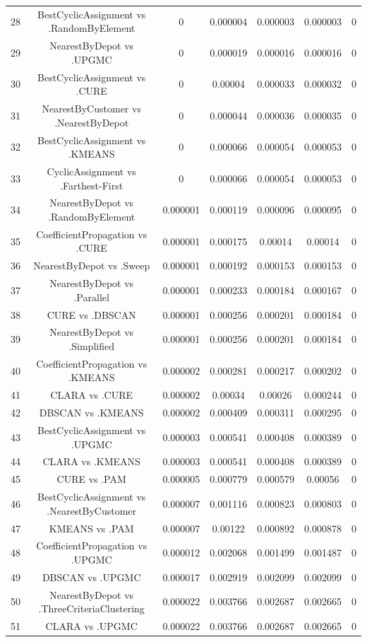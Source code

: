 \documentclass[a4paper,10pt]{article}
\begin{document}
\begin{landscape}
\begin{table}[!htp]
\begin{tabular}{ccccccc}
28&BestCyclicAssignment vs .RandomByElement&0&0.000004&0.000003&0.000003&0\\
29&NearestByDepot vs .UPGMC&0&0.000019&0.000016&0.000016&0\\
30&BestCyclicAssignment vs .CURE&0&0.00004&0.000033&0.000032&0\\
31&NearestByCustomer vs .NearestByDepot&0&0.000044&0.000036&0.000035&0\\
32&BestCyclicAssignment vs .KMEANS&0&0.000066&0.000054&0.000053&0\\
33&CyclicAssignment vs .Farthest-First&0&0.000066&0.000054&0.000053&0\\
34&NearestByDepot vs .RandomByElement&0.000001&0.000119&0.000096&0.000095&0\\
35&CoefficientPropagation vs .CURE&0.000001&0.000175&0.00014&0.00014&0\\
36&NearestByDepot vs .Sweep&0.000001&0.000192&0.000153&0.000153&0\\
37&NearestByDepot vs .Parallel&0.000001&0.000233&0.000184&0.000167&0\\
38&CURE vs .DBSCAN&0.000001&0.000256&0.000201&0.000184&0\\
39&NearestByDepot vs .Simplified&0.000001&0.000256&0.000201&0.000184&0\\
40&CoefficientPropagation vs .KMEANS&0.000002&0.000281&0.000217&0.000202&0\\
41&CLARA vs .CURE&0.000002&0.00034&0.00026&0.000244&0\\
42&DBSCAN vs .KMEANS&0.000002&0.000409&0.000311&0.000295&0\\
43&BestCyclicAssignment vs .UPGMC&0.000003&0.000541&0.000408&0.000389&0\\
44&CLARA vs .KMEANS&0.000003&0.000541&0.000408&0.000389&0\\
45&CURE vs .PAM&0.000005&0.000779&0.000579&0.00056&0\\
46&BestCyclicAssignment vs .NearestByCustomer&0.000007&0.001116&0.000823&0.000803&0\\
47&KMEANS vs .PAM&0.000007&0.00122&0.000892&0.000878&0\\
48&CoefficientPropagation vs .UPGMC&0.000012&0.002068&0.001499&0.001487&0\\
49&DBSCAN vs .UPGMC&0.000017&0.002919&0.002099&0.002099&0\\
50&NearestByDepot vs .ThreeCriteriaClustering&0.000022&0.003766&0.002687&0.002665&0\\
51&CLARA vs .UPGMC&0.000022&0.003766&0.002687&0.002665&0\\

\end{tabular}
\end{table}
\end{landscape}
\end{document}
